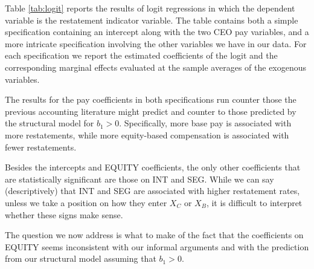 Table \ref{tab:logit} reports the results of logit regressions in which the dependent variable is the restatement indicator variable. 
The table contains both a simple specification containing an intercept along with the two CEO pay variables, and a more intricate specification involving the other variables we have in our data.
For each specification we report the estimated coefficients of the logit and the corresponding marginal effects evaluated at the sample averages of the exogenous variables.

The results for the pay coefficients in both specifications run counter those the previous accounting literature might predict and counter to those predicted by the structural model for $b_1 > 0$.
Specifically, more base pay is associated with more restatements, while more equity-based compensation is associated with fewer restatements.

Besides the intercepts and EQUITY coefficients, the only other coefficients that are statistically significant are those on INT and SEG.
While we can say (descriptively) that INT and SEG are associated with higher restatement rates, unless we take a position on how they enter $X_C$ or $X_B$, it is difficult to interpret whether these signs make sense.

The question we now address is what to make of the fact that the coefficients on EQUITY seems inconsistent with our informal arguments and with the prediction from our structural model assuming that $b_1>0$.


